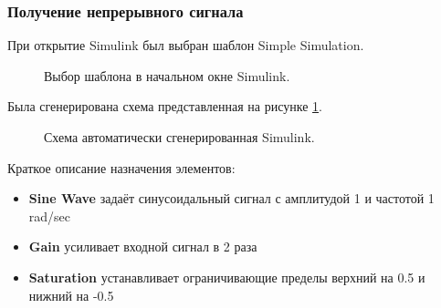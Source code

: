 \documentclass[a4paper,14pt]{extarticle}
\begin{document}
\subsubsection{Получение непрерывного сигнала}

При открытие Simulink был выбран шаблон Simple Simulation.

\begin{figure}[H]
\caption{Выбор шаблона в начальном окне Simulink.}
\end{figure}

Была сгенерирована схема представленная на рисунке \ref{001}.

\begin{figure}[H]
\caption{Схема автоматически сгенерированная Simulink.}
\label{001}
\end{figure}

Краткое описание назначения элементов:
\begin{itemize}
\item \textbf{Sine Wave} задаёт синусоидальный сигнал с 
амплитудой 1 и частотой 1 rad/sec
\item \textbf{Gain} усиливает входной сигнал в 2 раза
\item \textbf{Saturation} устанавливает ограничивающие пределы 
верхний на 0.5 и нижний на -0.5\\
\end{itemize}
\end{document}
